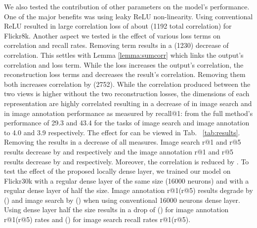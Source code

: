 \documentclass[10pt,twocolumn,letterpaper]{article}
\begin{document}
 We also tested the contribution of other parameters on the model's performance. One of the major benefits was using leaky ReLU non-linearity. Using conventional ReLU resulted in large correlation loss of about  (1192 total correlation) for Flickr8k. 
 Another aspect we tested is the effect of various loss terms on correlation and recall rates. Removing  term results in a  (1230) decrease of correlation. This settles with Lemma \ref{lemma:sumcorr} which links the output's correlation and  loss term. While the  loss increases the output's correlation, the reconstruction loss terms  and  decreases the result's correlation. Removing them both increases correlation by  (2752). While the correlation produced between the two views is higher without the two reconstruction losses, the dimensions of each representation are highly correlated resulting in a decrease of  in image search and  in image annotation performance as measured by recall@1: from the full method's performance of 29.3 and 43.4 for the tasks of image search and image annotation to 4.0 and 3.9 respectively.
 The effect for  can be viewed in Tab. ~\ref{tab:results}. Removing the  results in a decrease of all measures. Image search r@1 and r@5 results decrease by  and  respectively and the image annotation r@1 and r@5 results decrease by  and  respectively. Moreover, the correlation is reduced by . 
 To test the effect of the proposed locally dense layer, we trained our model on Flickr30k with a regular dense layer of the same size (16000 neurons) and with a regular dense layer of half the size. Image annotation r@1(r@5) results degrade by () and image search by () when using conventional 16000 neurons dense layer. Using dense layer half the size results in a drop of () for image annotation r@1(r@5) rates and () for image search recall rates r@1(r@5).
\end{document}
